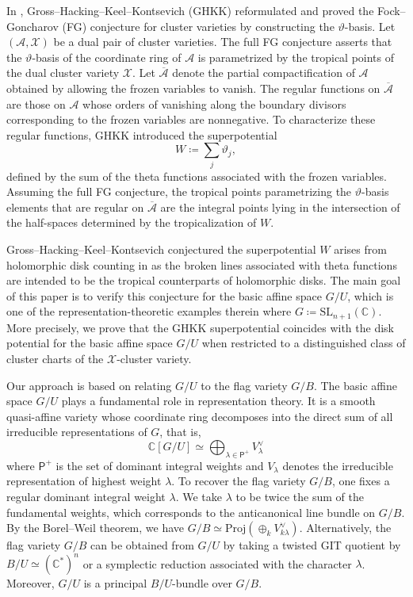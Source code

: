 \documentclass[11pt]{amsart}
\theoremstyle{plain}
\theoremstyle{definition}
\theoremstyle{remark}
\newcommand{\C}{\mathbb{C}}
\numberwithin{equation}{section} \numberwithin{table}{section}
\numberwithin{equation}{section}
\begin{document}
In \cite{GHKK18}, Gross--Hacking--Keel--Kontsevich (GHKK) reformulated and proved the Fock--Goncharov (FG) conjecture \cite{FG06} for cluster varieties by constructing the $\vartheta$-basis. Let $(\mathcal{A},\mathcal{X})$ be a dual pair of cluster varieties. The full FG conjecture \cite[Definition 0.6]{GHKK18} asserts that the $\vartheta$-basis of the coordinate ring of $\mathcal{A}$ is parametrized by the tropical points of the dual cluster variety $\mathcal{X}$. Let $\overline{\mathcal{A}}$ denote the partial compactification of $\mathcal{A}$ obtained by allowing the frozen variables to vanish. The regular functions on $\overline{\mathcal{A}}$ are those on $\mathcal{A}$ whose orders of vanishing along the boundary divisors corresponding to the frozen variables are nonnegative. To characterize these regular functions, GHKK introduced the superpotential
$$
W \coloneqq \sum_j \vartheta_j,
$$
defined by the sum of the theta functions associated with the frozen variables. Assuming the full FG conjecture, the tropical points parametrizing the $\vartheta$-basis elements that are regular on $\overline{\mathcal{A}}$ are the integral points lying in the intersection of the half-spaces determined by the tropicalization of $W$.

Gross--Hacking--Keel--Kontsevich \cite{GHKK18} conjectured the superpotential $W$ arises from holomorphic disk counting in \cite{CO06, Aur07} as the broken lines associated with theta functions are intended to be the tropical counterparts of holomorphic disks. The main goal of this paper is to verify this conjecture for the basic affine space $G/U$, which is one of the representation-theoretic examples therein where $G \coloneqq \mathrm{SL}_{n+1}(\C)$. More precisely, we prove that the GHKK superpotential coincides with the disk potential for the basic affine space $G/U$ when restricted to a distinguished class of cluster charts of the $\mathcal{X}$-cluster variety. 

Our approach is based on relating $G/U$ to the flag variety $G/B$. The basic affine space $G/U$ plays a fundamental role in representation theory. It is a smooth quasi-affine variety whose coordinate ring decomposes into the direct sum of all irreducible representations of $G$, that is,
$$
\mathbb{C}[G/U] \simeq \bigoplus_{\lambda \in \mathsf{P}^+} V^\vee_\lambda
$$
where $\mathsf{P}^+$ is the set of dominant integral weights and $V_\lambda$ denotes the irreducible representation of highest weight $\lambda$. To recover the flag variety $G/B$, one fixes a regular dominant integral weight $\lambda$. We take $\lambda$ to be twice the sum of the fundamental weights, which corresponds to the anticanonical line bundle on $G/B$. By the Borel--Weil theorem, we have $G/B \simeq \mathrm{Proj}(\oplus_{k} V_{k \lambda}^\vee)$. Alternatively, the flag variety $G/B$ can be obtained from $G/U$ by taking a twisted GIT quotient by $B/U \simeq (\C^*)^n$ or a symplectic reduction associated with the character $\lambda$. Moreover, $G/U$ is a principal $B/U$-bundle over $G/B$. 
\end{document}
